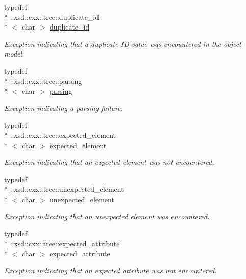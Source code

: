 \begin{DoxyCompactItemize}
typedef \\*
\-::xsd\-::cxx\-::tree\-::duplicate\-\_\-id\\*
$<$ char $>$ \hyperlink{namespacexml__schema_a22a2b3c973b87b06c2868d85a154fd63}{duplicate\-\_\-id}
\begin{DoxyCompactList}\small\item\em Exception indicating that a duplicate I\-D value was encountered in the object model. \end{DoxyCompactList}\item 
typedef \\*
\-::xsd\-::cxx\-::tree\-::parsing\\*
$<$ char $>$ \hyperlink{namespacexml__schema_a150f88d7d2156ae81807b142038684f5}{parsing}
\begin{DoxyCompactList}\small\item\em Exception indicating a parsing failure. \end{DoxyCompactList}\item 
typedef \\*
\-::xsd\-::cxx\-::tree\-::expected\-\_\-element\\*
$<$ char $>$ \hyperlink{namespacexml__schema_a4b608c951db27c574552da0bda062e1a}{expected\-\_\-element}
\begin{DoxyCompactList}\small\item\em Exception indicating that an expected element was not encountered. \end{DoxyCompactList}\item 
typedef \\*
\-::xsd\-::cxx\-::tree\-::unexpected\-\_\-element\\*
$<$ char $>$ \hyperlink{namespacexml__schema_a55835ab195e4c70bc05de5bbac871110}{unexpected\-\_\-element}
\begin{DoxyCompactList}\small\item\em Exception indicating that an unexpected element was encountered. \end{DoxyCompactList}\item 
typedef \\*
\-::xsd\-::cxx\-::tree\-::expected\-\_\-attribute\\*
$<$ char $>$ \hyperlink{namespacexml__schema_ad8a9d3a09372da61ab6ba78c4de87a26}{expected\-\_\-attribute}
\begin{DoxyCompactList}\small\item\em Exception indicating that an expected attribute was not encountered. \end{DoxyCompactList}\item 

\end{DoxyCompactItemize}
